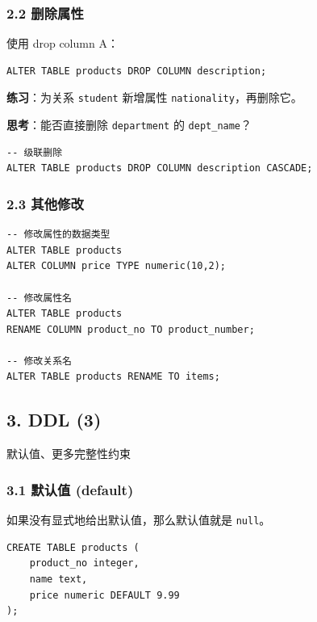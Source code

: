 \documentclass[aspectratio=169, 14pt]{beamer}
\begin{document}
\begin{frame}[fragile]
    \frametitle{2.2 删除属性}
    使用 \alert{drop column A}：
    \begin{verbatim}
ALTER TABLE products DROP COLUMN description; 
    \end{verbatim}    
    {\large {}}  \textbf{练习}：为关系 \texttt{student} 新增属性 \texttt{nationality}，再删除它。

\pause
{\large {}}  \textbf{思考}：能否直接删除 \texttt{department} 的 \texttt{dept\_name}？

\pause
{}  

\begin{verbatim}
-- 级联删除
ALTER TABLE products DROP COLUMN description CASCADE;
\end{verbatim}  

\end{frame}

\begin{frame}[fragile]
    \frametitle{2.3 其他修改}
    \begin{verbatim}
-- 修改属性的数据类型
ALTER TABLE products 
ALTER COLUMN price TYPE numeric(10,2);

-- 修改属性名
ALTER TABLE products 
RENAME COLUMN product_no TO product_number;

-- 修改关系名
ALTER TABLE products RENAME TO items;
    \end{verbatim}

\end{frame}

\begin{frame}
    \section{\textcolor{darkmidnightblue}{3. DDL (3)}} 
    默认值、更多完整性约束

\end{frame}

\begin{frame}[fragile]
    \frametitle{3.1 默认值 (default)}
如果没有显式地给出默认值，那么默认值就是 \texttt{null}。

\begin{verbatim}
CREATE TABLE products (
    product_no integer,
    name text,
    price numeric DEFAULT 9.99
);
\end{verbatim}

\end{frame}
\end{document}
